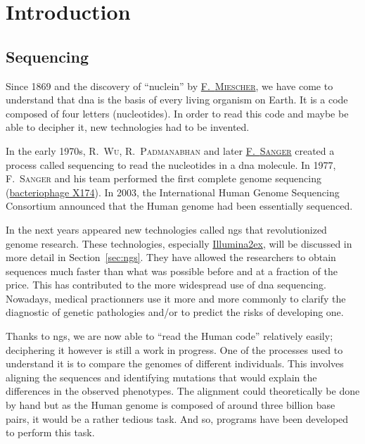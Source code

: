 \chapter{Introduction}


\section{Sequencing}\label{sec:sequencing}
Since 1869 and the discovery of ``nuclein'' by \href{https://books.google.fr/books?id=YJRTAAAAcAAJ&pg=PA456&redir_esc=y#v=onepage&q&f=false}{F.~\textsc{Miescher}}, we have come to understand that \gls{dna} is the basis of every living organism on Earth.
It is a code composed of four letters (nucleotides).
In order to read this code and maybe be able to decipher it, new technologies had to be invented.

In the early 1970s, R.~\textsc{Wu}, R.~\textsc{Padmanabhan} and later \href{https://www.ncbi.nlm.nih.gov/pubmed/271968}{F.~\textsc{Sanger}} created a process called sequencing to read the nucleotides in a \gls{dna} molecule.
In 1977, F.~\textsc{Sanger} and his team performed the first complete genome sequencing (\href{https://www.ncbi.nlm.nih.gov/pubmed/870828}{bacteriophage \textphi X174}).
In 2003, the International Human Genome Sequencing Consortium announced that the Human genome had been essentially sequenced.

In the next years appeared new technologies called \gls{ngs} that revolutionized genome research.
These technologies, especially \href{http://www.illumina.com/}{Illumina\ttfamily\tiny\raise2ex\hbox{\textregistered}}, will be discussed in more detail in Section~\ref{sec:ngs}.
They have allowed the researchers to obtain sequences much faster than what was possible before and at a fraction of the price.
This has contributed to the more widespread use of \gls{dna} sequencing.
Nowadays, medical practionners use it more and more commonly to clarify the diagnostic of genetic pathologies and\slash\hspace{0pt}or to predict the risks of developing one.

Thanks to \gls{ngs}, we are now able to ``read the Human code'' relatively easily; deciphering it however is still a work in progress.
One of the processes used to understand it is to compare the genomes of different individuals.
This involves aligning the sequences and identifying mutations that would explain the differences in the observed phenotypes.
The alignment could theoretically be done by hand but as the Human genome is composed of around three billion base pairs, it would be a rather tedious task.
And so, programs have been developed to perform this task.


